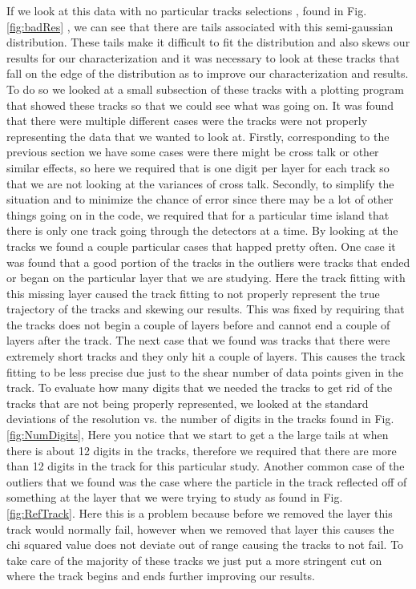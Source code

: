 \documentclass[./Thesis]{subfiles}
\begin{document}
	 If we look at this data with no particular tracks selections , found in Fig. \ref{fig:badRes} , we can see that there are tails associated with this semi-gaussian distribution. These tails make it difficult to fit the distribution and also skews our results for our characterization and it was necessary to look at these tracks that fall on the edge of the distribution as to improve our characterization and results. To do so we looked at a small subsection of these tracks with a plotting program that showed these tracks so that we could see what was going on. It was found that there were multiple different cases were the tracks were not properly representing the data that we wanted to look at. Firstly, corresponding to the previous section we have some cases were there might be cross talk or other similar effects, so here we required that is one digit per layer for each track so that we are not looking at the variances of cross talk. Secondly, to simplify the situation and to minimize the chance of error since there may be a lot of other things going on in the code, we required that for a particular time island that there is only one track going through the detectors at a time. By looking at the tracks we found a couple particular cases that happed pretty often.  One case it was found that a good portion of the tracks in the outliers were tracks that ended or began on the particular layer that we are studying. Here the track fitting with this missing layer caused the track fitting to not properly represent the true trajectory of the tracks and skewing our results. This was fixed by requiring that the tracks does not begin a couple of layers before and cannot end a couple of layers after the track. The next case that we found was tracks that there were extremely short tracks and they only hit a couple of layers. This causes the track fitting to be less precise due just to the shear number of data points given in the track. To evaluate how many digits that we needed the tracks to get rid of the tracks that are not being properly represented, we looked at the standard deviations of the resolution vs. the number of digits in the tracks found in Fig.\ref{fig:NumDigits},  Here you notice that we start to get a the large tails at when there is about 12 digits in the tracks, therefore we required that there are more than 12 digits in the track for this particular study.  Another common case of the outliers that we found was the case where the particle in the track reflected off of something at the layer that we were trying to study as found in Fig. \ref{fig:RefTrack}. Here this is a problem because before we removed the layer this track would normally fail, however when we removed that layer this causes the chi squared value does not deviate out of range causing the tracks to not fail. To take care of the majority of these tracks we just put a more stringent cut on where the track begins and ends further improving our results.
	
\end{document}
